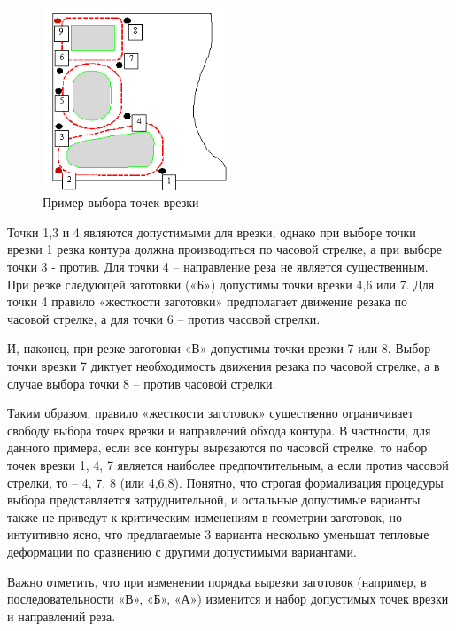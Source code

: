 \documentclass[12pt,twoside]{report}
\begin{document}
\begin{figure}
  \begin{center}
  \includegraphics[width=0.5\textwidth]{part-hardness.png}
  \caption{Пример выбора точек врезки}
  \label{part-hardness}
  \end{center}
\end{figure}

Точки 1,3 и 4 являются допустимыми для врезки,
однако при выборе точки врезки 1 резка контура
должна производиться по часовой стрелке,
а при выборе точки 3 - против.
Для точки 4 – направление реза не является существенным.
При резке следующей заготовки («Б»)
допустимы точки врезки 4,6 или 7.
Для точки 4 правило «жесткости заготовки»
предполагает движение резака по часовой стрелке,
а для точки 6 – против часовой стрелки.

И, наконец, при резке заготовки «В»
допустимы точки врезки 7 или 8.
Выбор точки врезки 7 диктует необходимость
движения резака по часовой стрелке,
а в случае выбора точки 8 – против часовой стрелки.

Таким образом, правило «жесткости заготовок»
существенно ограничивает свободу выбора точек
врезки и направлений обхода контура.
В частности, для данного примера,
если все контуры вырезаются по часовой стрелке,
то набор точек врезки 1, 4, 7
является наиболее предпочтительным,
а если против часовой стрелки, то – 4, 7, 8
(или 4,6,8).
Понятно, что строгая формализация процедуры
выбора представляется затруднительной,
и остальные допустимые варианты также не приведут
к критическим изменениям в геометрии заготовок,
но интуитивно ясно, что предлагаемые 3 варианта
несколько уменьшат тепловые деформации по сравнению
с другими допустимыми вариантами.

Важно отметить,
что при изменении порядка вырезки заготовок
(например, в последовательности «В», «Б», «А»)
изменится и набор допустимых точек врезки и направлений реза.
\end{document}
